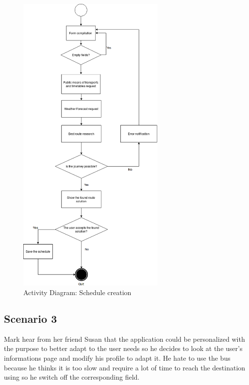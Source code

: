 \documentclass[numbers=noenddot, 12pt, a4paper, oneside]{scrbook}
\begin{document}
\begin{figure}[H]
	\centering
	\includegraphics[width=0.65\textwidth]{flows/Scenario2}
	\caption{Activity Diagram: Schedule creation}
\end{figure}

\subsection*{Scenario 3}

Mark hear from her friend Susan that the application could be personalized with the purpose to better adapt to the user needs so he decides to look at the user’s informations page and modify his profile to adapt it.
He hate to use the bus because he thinks it is too slow and require a lot of time to reach the destination using so he switch off the corresponding field.\\
\end{document}
